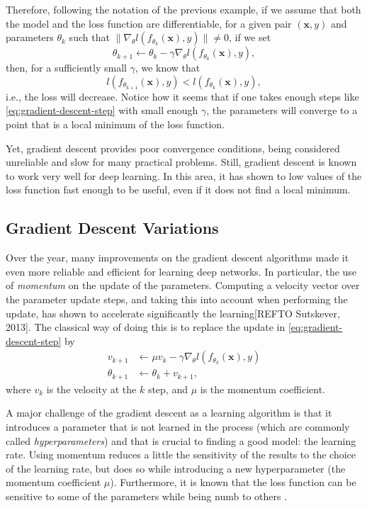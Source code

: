 Therefore, following the notation of the previous example, if we assume that both the model and the loss function are differentiable, for a given pair $(\bm{x},y)$ and parameters $\theta_k$ such that $\| \nabla_\theta l(f_{\theta_k}(\bm{x}),y) \| \neq 0$, if we set \[
\theta_{k+1} \gets \theta_k - \gamma \nabla_\theta l(f_{\theta_k}(\bm{x}),y) \tag{$*$}\label{eq:gradient-descent-step}
,\] then, for a sufficiently small $\gamma$, we know that \[
l(f_{\theta_{k+1}}(\bm{x}),y) < l(f_{\theta_k}(\bm{x}),y)
,\] i.e., the loss will decrease.
Notice how it seems that if one takes enough steps like \eqref{eq:gradient-descent-step} with small enough $\gamma$, the parameters will converge to a point that is a local minimum of the loss function.


Yet, gradient descent provides poor convergence conditions\cite{wolfe_convergence_1969}, being considered unreliable and slow for many practical problems.
Still, gradient descent is known to work very well for deep learning.
In this area, it has shown to low values of the loss function fast enough to be useful, even if it does not find a local minimum.
\cite{goodfellow_deep_2016}

\subsection{Gradient Descent Variations}

Over the year, many improvements on the gradient descent algorithms made it even more reliable and efficient for learning deep networks.
In particular, the use of \textit{momentum} on the update of the parameters.
Computing a velocity vector over the parameter update steps, and taking this into account when performing the update, has shown to accelerate significantly the learning[REFTO Sutskever, 2013].
The classical way of doing this is to replace the update in \eqref{eq:gradient-descent-step} by
\begin{align*}
    v_{k+1} &\gets \mu v_k - \gamma \nabla_\theta l(f_{\theta_k}(\bm{x}),y) \\
    \theta_{k+1} &\gets \theta_k + v_{k+1}
,\end{align*}
where $v_k$ is the velocity at the $k$ step, and $\mu$ is the momentum coefficient.

A major challenge of the gradient descent as a learning algorithm is that it introduces a parameter that is not learned in the process (which are commonly called \emph{hyperparameters}) and that is crucial to finding a good model: the learning rate.
Using momentum reduces a little the sensitivity of the results to the choice of the learning rate, but does so while introducing a new hyperparameter (the momentum coefficient $\mu$).
Furthermore, it is known that the loss function can be sensitive to some of the parameters while being numb to others \cite{goodfellow_deep_2016}.

